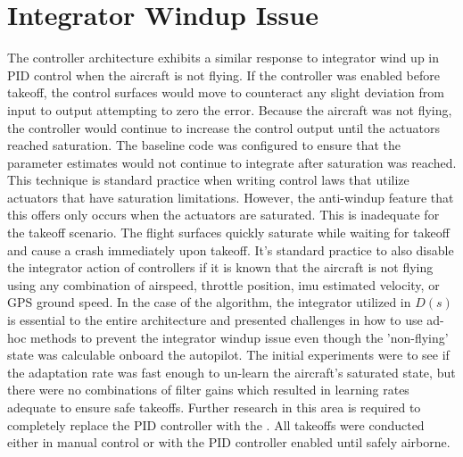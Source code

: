\section{Integrator Windup Issue}
The \Lone controller architecture exhibits a similar response to integrator wind up in \ac{PID} control when the aircraft is not flying.  If the controller was enabled before takeoff, the control surfaces would move to counteract any slight deviation from input to output attempting to zero the error. Because the aircraft was not flying, the controller would continue to increase the control output until the actuators reached saturation.  The baseline code was configured to ensure that the parameter estimates would not continue to integrate after saturation was reached.  This technique is standard practice when writing control laws that utilize actuators that have saturation limitations.  However, the anti-windup feature that this offers only occurs when the actuators are saturated.  This is inadequate for the takeoff scenario.  The flight surfaces quickly saturate while waiting for takeoff and cause a crash immediately upon takeoff.  It's standard practice to also disable the integrator action of controllers if it is known that the aircraft is not flying using any combination of airspeed, throttle position, \ac{imu} estimated velocity, or \ac{GPS} ground speed.  In the case of the \Lone algorithm, the integrator utilized in $D(s)$ is essential to the entire architecture and presented challenges in how to use ad-hoc methods to prevent the integrator windup issue even though the 'non-flying' state was calculable onboard the autopilot.  The initial experiments were to see if the adaptation rate was fast enough to un-learn the aircraft's saturated state, but there were no combinations of filter gains which resulted in learning rates adequate to ensure safe takeoffs.  Further research in this area is required to completely replace the \ac{PID} controller with the \Lone.  All takeoffs were conducted either in manual control or with the \ac{PID} controller enabled until safely airborne.


